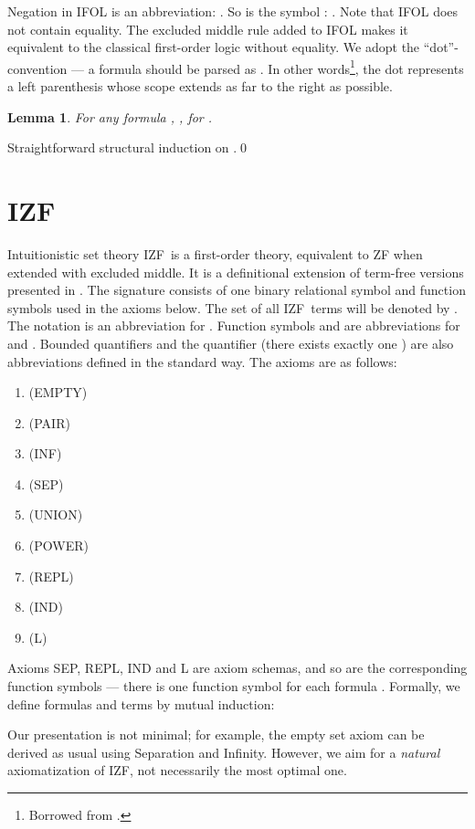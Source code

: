 \documentclass{LMCS}
\newtheorem{lemma}[thm]{Lemma}
\newcommand{\izfr}{IZF}
\begin{document}
Negation in IFOL is an abbreviation: . So is the symbol : . Note that IFOL does not contain equality. The excluded middle rule added to IFOL makes it equivalent
to the classical first-order logic without equality. We adopt the
``dot''-convention --- a formula  should be parsed as
. In other words\footnote{Borrowed from \cite{urzy}.}, the
dot represents a left parenthesis whose scope extends as far to the right as
possible. 



\begin{lemma}\label{formsubst}
For any formula , , for . 
\end{lemma}
\proof Straightforward structural induction on .\qed



\section{\izfr}\label{izf}

Intuitionistic set theory \izfr\ is a first-order theory, equivalent to ZF
when extended with excluded middle. It is a definitional extension of
term-free versions presented in \cite{myhill72,beesonbook,frsce3}.
The signature consists of one binary relational symbol  and function symbols used in the axioms below.
The set of all \izfr\ terms will be denoted by . The notation  is an abbreviation for . Function symbols  and  are abbreviations for
 and . Bounded quantifiers and the quantifier  (there exists exactly one ) are also abbreviations 
defined in the standard way. The axioms are as follows:

\begin{enumerate}[]
\item (EMPTY) 
\item (PAIR) 
\item (INF) 
\item (SEP)

\item (UNION) 
\item (POWER) 
\item (REPL) 
\item (IND) 
\item (L) 
\end{enumerate}

Axioms SEP, REPL, IND and L are axiom schemas, and
so are the corresponding function symbols ---
there is one function symbol for each formula . Formally, we define formulas and terms by mutual induction:


Our presentation is not minimal; for example, the empty set axiom can be
derived as usual using Separation and Infinity. However, we aim for a
\emph{natural} axiomatization of \izfr, not necessarily the most optimal one. 
\end{document}
